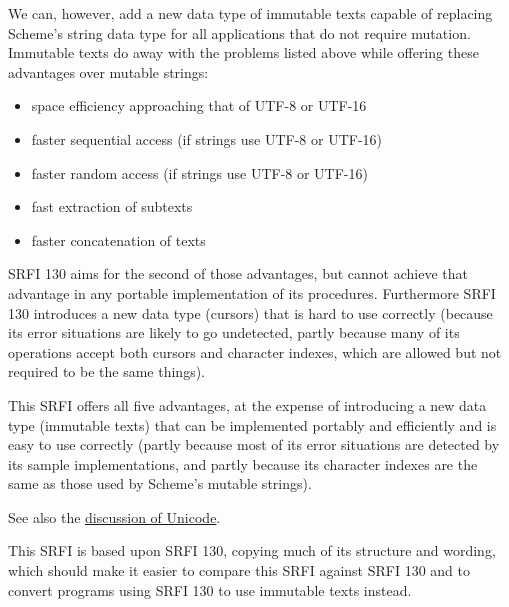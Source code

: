 We can, however, add a new data type of immutable texts capable of
replacing Scheme's string data type for all applications that do not
require mutation. Immutable texts do away with the problems listed above
while offering these advantages over mutable strings:

\begin{itemize}
\tightlist
\item
  space efficiency approaching that of UTF-8 or UTF-16
\item
  faster sequential access (if strings use UTF-8 or UTF-16)
\item
  faster random access (if strings use UTF-8 or UTF-16)
\item
  fast extraction of subtexts
\item
  faster concatenation of texts
\end{itemize}

SRFI 130 aims for the second of those advantages, but cannot achieve
that advantage in any portable implementation of its procedures.
Furthermore SRFI 130 introduces a new data type (cursors) that is hard
to use correctly (because its error situations are likely to go
undetected, partly because many of its operations accept both cursors
and character indexes, which are allowed but not required to be the same
things).

This SRFI offers all five advantages, at the expense of introducing a
new data type (immutable texts) that can be implemented portably and
efficiently and is easy to use correctly (partly because most of its
error situations are detected by its sample implementations, and partly
because its character indexes are the same as those used by Scheme's
mutable strings).

See also the \protect\hyperlink{Unicode}{discussion of Unicode}.

This SRFI is based upon SRFI 130, copying much of its structure and
wording, which should make it easier to compare this SRFI against SRFI
130 and to convert programs using SRFI 130 to use immutable texts
instead.

